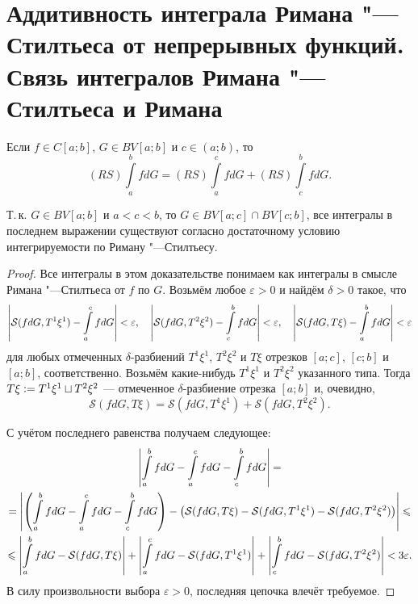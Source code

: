 \section{Аддитивность интеграла Римана "---Стилтьеса от непрерывных функций. Связь интегралов Римана "---Стилтьеса и Римана}

\begin{theorem}
    Если $f \in C[a; b]$, $G \in BV[a; b]$ и $c \in (a; b)$, то
    \[
        (RS)\int\limits_a^bfdG = (RS)\int\limits_a^cfdG + (RS)\int\limits_c^bfdG.
    \]
\end{theorem}

\begin{remark}
    Т.\,к. $G \in BV[a; b]$ и $a < c < b$, то $G \in BV[a; c] \cap BV[c; b]$, все интегралы в последнем выражении существуют согласно достаточному условию интегрируемости по Риману "---Стилтьесу.
\end{remark}

\begin{proof}
    Все интегралы в этом доказательстве понимаем как интегралы в смысле Римана "---Стилтьеса от $f$ по $G$. Возьмём любое $\varepsilon > 0$ и найдём $\delta > 0$ такое, что
    \[
        \left\lvert\mathcal{S}(fdG, T^1\xi^1) - \int\limits_a^cfdG\right\rvert < \varepsilon,\quad\left\lvert\mathcal{S}(fdG, T^2\xi^2) - \int\limits_c^bfdG\right\rvert < \varepsilon,\quad\left\lvert\mathcal{S}(fdG, T\xi) - \int\limits_a^bfdG\right\rvert < \varepsilon
    \]
    для любых отмеченных $\delta$-разбиений $T^1\xi^1$, $T^2\xi^2$ и $T\xi$ отрезков $[a; c]$, $[c; b]$ и $[a; b]$, соответственно. Возьмём какие-нибудь $T^1\xi^1$ и $T^2\xi^2$ указанного типа. Тогда $T\xi \vcentcolon = T^1\xi^1 \sqcup T^2\xi^2$ --- отмеченное $\delta$-разбиение отрезка $[a; b]$ и, очевидно,
    \[
        \mathcal{S}(fdG, T\xi) = \mathcal{S}(fdG, T^1\xi^1) + \mathcal{S}(fdG, T^2\xi^2).
    \]

    С учётом последнего равенства получаем следующее:
    \begin{multline*}
        \left\lvert\int\limits_a^bfdG - \int\limits_a^cfdG - \int\limits_c^bfdG\right\rvert =\\ = \left\lvert\left(\int\limits_a^bfdG - \int\limits_a^cfdG - \int\limits_c^bfdG\right) - \left(\mathcal{S}(fdG, T\xi) - \mathcal{S}(fdG, T^1\xi^1) - \mathcal{S}(fdG, T^2\xi^2)\right)\right\rvert \leqslant\\ \leqslant \left\lvert\int\limits_a^bfdG - \mathcal{S}(fdG, T\xi)\right\rvert + \left\lvert\int\limits_a^cfdG - \mathcal{S}(fdG, T^1\xi^1)\right\rvert + \left\lvert\int\limits_c^bfdG - \mathcal{S}(fdG, T^2\xi^2)\right\rvert < 3\varepsilon.
    \end{multline*}
    В силу произвольности выбора $\varepsilon > 0$, последняя цепочка влечёт требуемое.
\end{proof}

